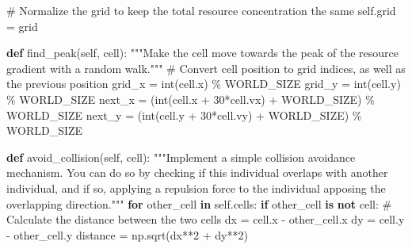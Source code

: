 \documentclass[
  letterpaper,
  DIV=11,
  numbers=noendperiod]{scrreprt}
\newenvironment{Shaded}{\begin{snugshade}}{\end{snugshade}}
\newcommand{\BuiltInTok}[1]{\textcolor[rgb]{0.00,0.23,0.31}{#1}}
\newcommand{\CommentTok}[1]{\textcolor[rgb]{0.37,0.37,0.37}{#1}}
\newcommand{\ControlFlowTok}[1]{\textcolor[rgb]{0.00,0.23,0.31}{\textbf{#1}}}
\newcommand{\DecValTok}[1]{\textcolor[rgb]{0.68,0.00,0.00}{#1}}
\newcommand{\KeywordTok}[1]{\textcolor[rgb]{0.00,0.23,0.31}{\textbf{#1}}}
\newcommand{\NormalTok}[1]{\textcolor[rgb]{0.00,0.23,0.31}{#1}}
\newcommand{\OperatorTok}[1]{\textcolor[rgb]{0.37,0.37,0.37}{#1}}
\newcommand{\VariableTok}[1]{\textcolor[rgb]{0.07,0.07,0.07}{#1}}
\theoremstyle{definition}
\theoremstyle{remark}
\begin{document}
\begin{tcolorbox}
\begin{Shaded}
\begin{Highlighting}[]
        \CommentTok{\# Normalize the grid to keep the total resource concentration the same}
        \VariableTok{self}\NormalTok{.grid }\OperatorTok{=}\NormalTok{ grid}
    
    \KeywordTok{def}\NormalTok{ find\_peak(}\VariableTok{self}\NormalTok{, cell):}
        \CommentTok{"""Make the cell move towards the peak of the resource gradient with a random walk."""}
        \CommentTok{\# Convert cell position to grid indices, as well as the previous position}
\NormalTok{        grid\_x }\OperatorTok{=} \BuiltInTok{int}\NormalTok{(cell.x) }\OperatorTok{\%}\NormalTok{ WORLD\_SIZE}
\NormalTok{        grid\_y }\OperatorTok{=} \BuiltInTok{int}\NormalTok{(cell.y) }\OperatorTok{\%}\NormalTok{ WORLD\_SIZE}
\NormalTok{        next\_x }\OperatorTok{=}\NormalTok{ (}\BuiltInTok{int}\NormalTok{(cell.x }\OperatorTok{+} \DecValTok{30}\OperatorTok{*}\NormalTok{cell.vx) }\OperatorTok{+}\NormalTok{ WORLD\_SIZE) }\OperatorTok{\%}\NormalTok{ WORLD\_SIZE }
\NormalTok{        next\_y }\OperatorTok{=}\NormalTok{ (}\BuiltInTok{int}\NormalTok{(cell.y }\OperatorTok{+} \DecValTok{30}\OperatorTok{*}\NormalTok{cell.vy) }\OperatorTok{+}\NormalTok{ WORLD\_SIZE) }\OperatorTok{\%}\NormalTok{ WORLD\_SIZE }
         
    
    \KeywordTok{def}\NormalTok{ avoid\_collision(}\VariableTok{self}\NormalTok{, cell):}
        \CommentTok{"""Implement a simple collision avoidance mechanism. You can do so by}
\CommentTok{        checking if this individual overlaps with another individual, and if so,}
\CommentTok{        applying a repulsion force to the individual apposing the overlapping}
\CommentTok{        direction."""}
        \ControlFlowTok{for}\NormalTok{ other\_cell }\KeywordTok{in} \VariableTok{self}\NormalTok{.cells:}
            \ControlFlowTok{if}\NormalTok{ other\_cell }\KeywordTok{is} \KeywordTok{not}\NormalTok{ cell:}
                \CommentTok{\# Calculate the distance between the two cells}
\NormalTok{                dx }\OperatorTok{=}\NormalTok{ cell.x }\OperatorTok{{-}}\NormalTok{ other\_cell.x}
\NormalTok{                dy }\OperatorTok{=}\NormalTok{ cell.y }\OperatorTok{{-}}\NormalTok{ other\_cell.y}
\NormalTok{                distance }\OperatorTok{=}\NormalTok{ np.sqrt(dx}\OperatorTok{**}\DecValTok{2} \OperatorTok{+}\NormalTok{ dy}\OperatorTok{**}\DecValTok{2}\NormalTok{)}
                

\end{Highlighting}
\end{Shaded}
\end{tcolorbox}
\end{document}
